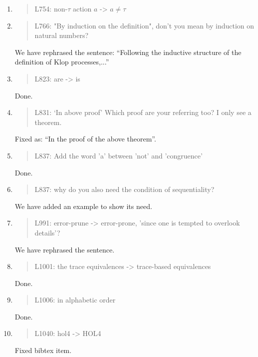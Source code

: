 \begin{enumerate}
\item \begin{quote}
    L754: non-$\tau$ action $a$ -> $a\neq\tau$
  \end{quote}

\item \begin{quote}
    L766: "By induction on the definition", don't you mean by induction on natural numbers?
  \end{quote}
  We have rephrased the sentence: ``Following the inductive structure
  of the definition of Klop processes,...''
  
\item \begin{quote}
    L823: are -> is
  \end{quote}
  Done.
  
\item \begin{quote}
    L831: `In above proof’ Which proof are your referring too? I only see a theorem.
  \end{quote}
  Fixed as: ``In the proof of the above theorem''.
  
\item \begin{quote}
    L837: Add the word 'a' between 'not' and 'congruence'
  \end{quote}
  Done.
  
\item \begin{quote}
    L837: why do you also need the condition of sequentiality?
  \end{quote}
  We have added an example to show its need.
  
\item \begin{quote}
    L991: error-prune -> error-prone, ’since one is tempted to overlook details’?
  \end{quote}
  We have rephrased the sentence.
  
\item \begin{quote}
    L1001: the trace equivalences -> trace-based equivalences
  \end{quote}
  Done.
  
\item \begin{quote}
    L1006: in alphabetic order
  \end{quote}
  Done.
  
\item \begin{quote}
    L1040: hol4 -> HOL4
  \end{quote}
  Fixed bibtex item.
  
\end{enumerate}
